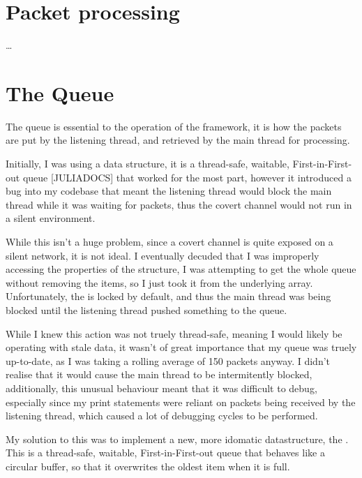\section{Packet processing}

\dots

\section{The Queue}
\label{sec:queue}

The queue is essential to the operation of the framework, it is how the packets are put by the listening thread, and retrieved by the main thread for processing.

Initially, I was using a  data structure, it is a thread-safe, waitable, First-in-First-out queue [JULIADOCS] that worked for the most part, however it introduced a bug into my codebase that meant the listening thread would block the main thread while it was waiting for packets, thus the covert channel would not run in a silent environment.

While this isn't a huge problem, since a covert channel is quite exposed on a silent network, it is not ideal. I eventually decuded that I was improperly accessing the properties of the structure, I was attempting to get the whole queue without removing the items, so I just took it from the underlying array. Unfortunately, the  is locked by default, and thus the main thread was being blocked until the listening thread pushed something to the queue.

While I knew this action was not truely thread-safe, meaning I would likely be operating with stale data, it wasn't of great importance that my queue was truely up-to-date, as I was taking a rolling average of 150 packets anyway. I didn't realise that it would cause the main thread to be intermitently blocked, additionally, this unusual behaviour meant that it was difficult to debug, especially since my print statements were reliant on packets being received by the listening thread, which caused a lot of debugging cycles to be performed.

My solution to this was to implement a new, more idomatic datastructure, the . This is a thread-safe, waitable, First-in-First-out queue that behaves like a circular buffer, so that it overwrites the oldest item when it is full.

